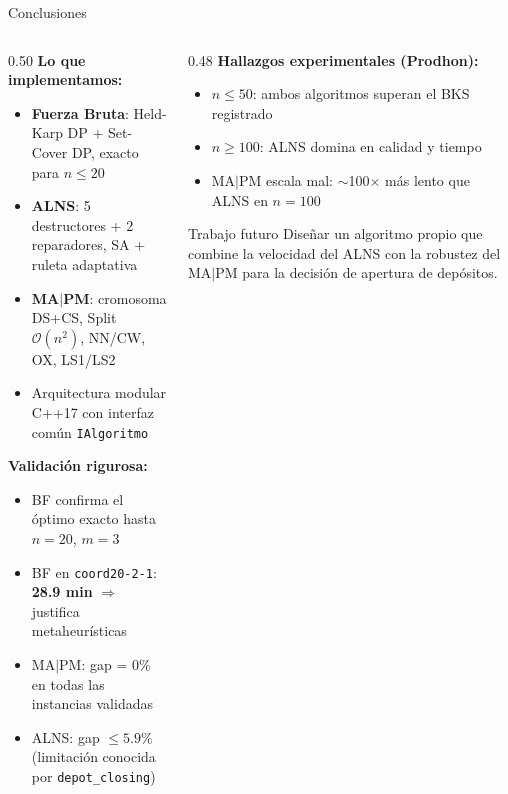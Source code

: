 \documentclass[aspectratio=169,10pt]{beamer}
\newcommand{\tc}[1]{\texttt{\small #1}}
\begin{document}
\begin{frame}{Conclusiones}
  \begin{columns}[T,onlytextwidth]
    \begin{column}{0.50\textwidth}
      \textbf{Lo que implementamos:}
      \begin{itemize}\small
        \item \textbf{Fuerza Bruta}: Held-Karp DP + Set-Cover DP, exacto para $n\le20$
        \item \textbf{ALNS}: 5 destructores + 2 reparadores, SA + ruleta adaptativa
        \item \textbf{MA$|$PM}: cromosoma DS+CS, Split $\mathcal{O}(n^2)$, NN/CW, OX, LS1/LS2
        \item Arquitectura modular C++17 con interfaz común \tc{IAlgoritmo}
      \end{itemize}
      \vspace{0.3em}
      \textbf{Validación rigurosa:}
      \begin{itemize}\small
        \item BF confirma el óptimo exacto hasta $n=20$, $m=3$
        \item BF en \texttt{coord20-2-1}: \textbf{28.9 min} $\Rightarrow$ justifica metaheurísticas
        \item MA$|$PM: gap = 0\% en todas las instancias validadas
        \item ALNS: gap $\le 5.9\%$ (limitación conocida por \texttt{depot\_closing})
      \end{itemize}
    \end{column}
    \begin{column}{0.48\textwidth}
      \textbf{Hallazgos experimentales (Prodhon):}
      \begin{itemize}\small
        \item $n \le 50$: ambos algoritmos superan el BKS registrado
        \item $n \ge 100$: ALNS domina en calidad y tiempo
        \item MA$|$PM escala mal: $\sim$100$\times$ más lento que ALNS en $n=100$
      \end{itemize}
      \vspace{0.4em}
      \begin{alertblock}{Trabajo futuro}
        \small Diseñar un algoritmo propio que combine la velocidad del ALNS con la robustez del MA$|$PM para la decisión de apertura de depósitos.
      \end{alertblock}
    \end{column}
  \end{columns}
\end{frame}
\end{document}
